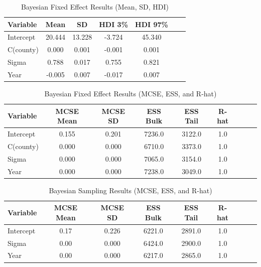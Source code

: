 \documentclass{article}
\begin{document}
\begin{table}[ht]
	\centering
	\caption{Bayesian Fixed Effect Results (Mean, SD, HDI)}
	\begin{tabular}{lcccccc}
		\hline
		\textbf{Variable} & \textbf{Mean} & \textbf{SD} & \textbf{HDI 3\%} & \textbf{HDI 97\%} \\
		\hline
		Intercept         & 20.444        & 13.228      & -3.724           & 45.340            \\
		C(county)         & 0.000         & 0.001       & -0.001           & 0.001             \\
		Sigma             & 0.788         & 0.017       & 0.755            & 0.821             \\
		Year              & -0.005        & 0.007       & -0.017           & 0.007             \\
		\hline
	\end{tabular}
\end{table}


\begin{table}[ht]
	\centering
	\caption{Bayesian Fixed Effect Results (MCSE, ESS, and R-hat)}
	\begin{tabular}{lcccccccc}
		\hline
		\textbf{Variable} & \textbf{MCSE Mean} & \textbf{MCSE SD} & \textbf{ESS Bulk} & \textbf{ESS Tail} & \textbf{R-hat} \\
		\hline
		Intercept         & 0.155              & 0.201            & 7236.0            & 3122.0            & 1.0            \\
		C(county)         & 0.000              & 0.000            & 6710.0            & 3373.0            & 1.0            \\
		Sigma             & 0.000              & 0.000            & 7065.0            & 3154.0            & 1.0            \\
		Year              & 0.000              & 0.000            & 7238.0            & 3049.0            & 1.0            \\
		\hline
	\end{tabular}
\end{table}


\begin{table}[ht]
	\centering
	\caption{Bayesian Sampling Results (MCSE, ESS, and R-hat)}
	\begin{tabular}{lcccccccc}
		\hline
		\textbf{Variable} & \textbf{MCSE Mean} & \textbf{MCSE SD} & \textbf{ESS Bulk} & \textbf{ESS Tail} & \textbf{R-hat} \\
		\hline
		Intercept         & 0.17               & 0.226            & 6221.0            & 2891.0            & 1.0            \\
		Sigma             & 0.00               & 0.000            & 6424.0            & 2900.0            & 1.0            \\
		Year              & 0.00               & 0.000            & 6217.0            & 2865.0            & 1.0            \\
		\hline
	\end{tabular}
\end{table}
\end{document}
